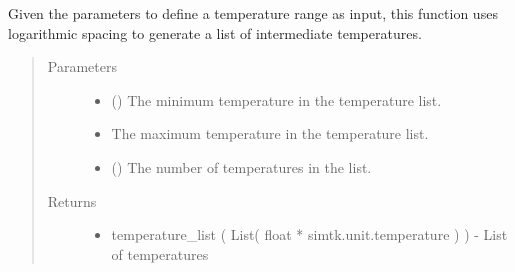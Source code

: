 \documentclass[letterpaper,12pt,english,openany,oneside]{sphinxmanual}
\begin{document}
\begin{fulllineitems}
\label{\detokenize{thermo:parameters.reweight.get_temperature_list}}
Given the parameters to define a temperature range as input, this function uses logarithmic spacing to generate a list of intermediate temperatures.
\begin{quote}\begin{description}
\item[{Parameters}] \leavevmode\begin{itemize}
\item {} 
 () \textendash{} The minimum temperature in the temperature list.

\item {} 
 \textendash{} The maximum temperature in the temperature list.

\item {} 
 () \textendash{} The number of temperatures in the list.

\end{itemize}

\item[{Returns}] \leavevmode
\begin{itemize}
\item {} 
temperature\_list ( List( float * simtk.unit.temperature ) ) - List of temperatures

\end{itemize}


\end{description}\end{quote}

\end{fulllineitems}

\end{document}
